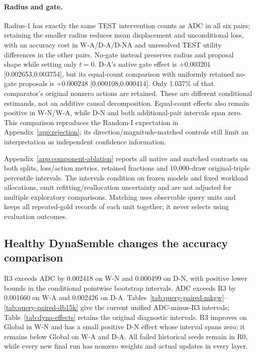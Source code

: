 \documentclass[11pt,a4paper]{article}
\begin{document}
\paragraph{Radius and gate.}
Radius-1 has exactly the same TEST intervention counts as ADC in all six pairs; retaining the smaller radius reduces mean displacement and unconditional loss, with an accuracy cost in W-A/D-A/D-NA and unresolved TEST utility differences in the other pairs. No-gate instead preserves radius and proposal shape while setting only $t=0$. D-A's native gate effect is $+0.003201$ [0.002653,0.003754], but its equal-count comparison with uniformly retained no-gate proposals is $+0.000248$ [0.000108,0.000414]. Only 1.037\% of that comparator's original nonzero actions are retained. These are different conditional estimands, not an additive causal decomposition. Equal-count effects also remain positive in W-N/W-A, while D-N and both additional-pair intervals span zero. This comparison reproduces the Random-I expectation in Appendix~\ref{app:rejection}; its direction/magnitude-matched controls still limit an interpretation as independent confidence information.

Appendix~\ref{app:component-ablation} reports all native and matched contrasts on both splits, loss/action metrics, retained fractions and 10,000-draw original-triple percentile intervals. The intervals condition on frozen models and fixed workload allocations, omit refitting/reallocation uncertainty and are not adjusted for multiple exploratory comparisons. Matching uses observable query units and keeps all repeated-gold records of each unit together; it never selects using evaluation outcomes.

\subsection{Healthy DynaSemble changes the accuracy comparison}
R3 exceeds ADC by 0.002418 on W-N and 0.000499 on D-N, with positive lower bounds in the conditional pointwise bootstrap intervals. ADC exceeds R3 by 0.001660 on W-A and 0.002426 on D-A. Tables~\ref{tab:query-paired-mkgw}--\ref{tab:query-paired-db15k} give the current unified ADC-minus-R3 intervals; Table~\ref{tab:dyna-effects} retains the original diagnostic intervals. R3 improves on Global in W-N and has a small positive D-N effect whose interval spans zero; it remains below Global on W-A and D-A. All failed historical seeds remain in R0, while every new final run has nonzero weights and actual updates in every layer.
\end{document}
